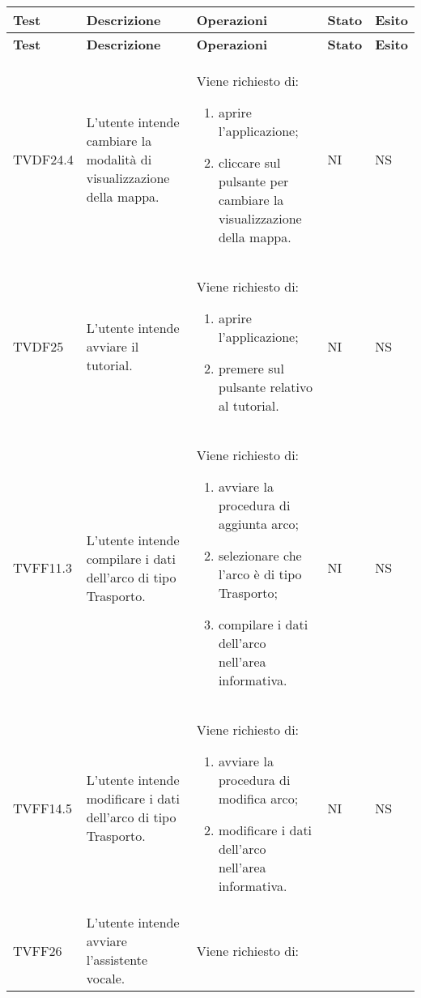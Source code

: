 \def\arraystretch{1.5}
\begin{longtable}{p{1.8cm}!{\VRule[1pt]}p{3.5cm}!{\VRule[1pt]}p{5.5cm}!{\VRule[1pt]}p{1cm}!{\VRule[1pt]}p{1cm}}
	\color{white} \textbf{Test} & \color{white} \textbf{Descrizione} & \color{white} \textbf{Operazioni} & \color{white} \textbf{Stato} & \color{white} \textbf{Esito} \\ 
	\endfirsthead 
	\color{white} \textbf{Test} & \color{white} \textbf{Descrizione} & \color{white} \textbf{Operazioni} & \color{white} \textbf{Stato} & \color{white} \textbf{Esito} \\ 
	\endhead 
	TVDF24.4 & L'utente intende cambiare la modalità di visualizzazione della mappa. & Viene richiesto di: \begin{enumerate} 
		\item aprire l'applicazione; 
		\item cliccare sul pulsante per cambiare la visualizzazione della mappa. 
	\end{enumerate} & NI & NS \\ 
	TVDF25 & L'utente intende avviare il tutorial. & Viene richiesto di: \begin{enumerate} 
		\item aprire l'applicazione; 
		\item premere sul pulsante relativo al tutorial. 
	\end{enumerate} & NI & NS \\ 
	TVFF11.3 & L'utente intende compilare i dati dell'arco di tipo Trasporto. & Viene richiesto di: \begin{enumerate} 
		\item avviare la procedura di aggiunta arco; 
		\item selezionare che l'arco è di tipo Trasporto; 
		\item compilare i dati dell'arco nell'area informativa. 
	\end{enumerate} & NI & NS \\ 
	TVFF14.5 & L'utente intende modificare i dati dell'arco di tipo Trasporto. & Viene richiesto di: \begin{enumerate} 
		\item avviare la procedura di modifica arco; 
		\item modificare i dati dell'arco nell'area informativa. 
	\end{enumerate} & NI & NS \\ 
	TVFF26 & L'utente intende avviare l'assistente vocale. & Viene richiesto di: \begin{enumerate} 

\end{enumerate}
\end{longtable}
